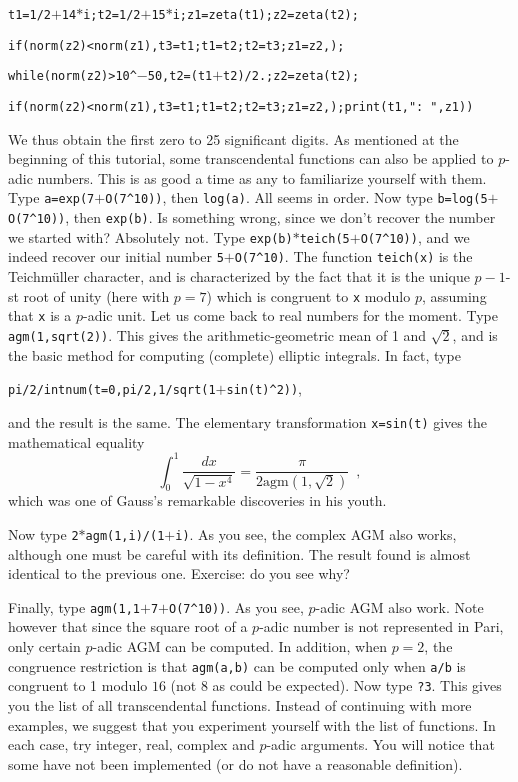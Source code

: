 \centerline{\tt t1=1/2$+$14$*$i;t2=1/2$+$15$*$i;z1=zeta(t1);z2=zeta(t2);}

\centerline{\tt if(norm(z2)<norm(z1),t3=t1;t1=t2;t2=t3;z1=z2,);}

\centerline{\tt while(norm(z2)>10\^{}$-$50,t2=(t1$+$t2)/2.;z2=zeta(t2);\bs}

\centerline{\tt if(norm(z2)<norm(z1),t3=t1;t1=t2;t2=t3;z1=z2,);print(t1,": ",z1))}

We thus obtain the first zero to 25 significant digits. 
\medskip
As mentioned at the beginning of this tutorial, some transcendental functions
can also be applied to $p$-adic numbers. This is as good a time as any to
familiarize yourself with them. Type {\tt a=exp(7$+$O(7\^{}10))}, then
{\tt log(a)}. All seems in order. Now type {\tt b=log(5$+$O(7\^{}10))}, then
{\tt exp(b)}. Is something wrong, since we don't recover the number we
started with? Absolutely not. Type {\tt exp(b)$*$teich(5$+$O(7\^{}10))}, and
we indeed recover our initial number {\tt 5$+$O(7\^{}10)}. The function
{\tt teich(x)} is the Teichm\"uller character, and is characterized by the
fact that it is the unique $p-1$-st root of unity (here with $p=7$) which
is congruent to {\tt x} modulo $p$, assuming that {\tt x} is a $p$-adic
unit. 
\smallskip
Let us come back to real numbers for the moment. Type {\tt agm(1,sqrt(2))}. 
This gives the arithmetic-geometric mean of 1 
and $\sqrt2$, and is the basic method for computing (complete) elliptic
integrals. In fact, type 

{\tt pi/2/intnum(t=0,pi/2,1/sqrt(1$+$sin(t)\^{}2))},

and the result is the same. The elementary transformation {\tt x=sin(t)}
gives the mathematical equality
$$\int_0^1\dfrac{dx}{\sqrt{1-x^4}}=\dfrac{\pi}{2\text{agm}(1,\sqrt2)}\enspace,$$
which was one of Gauss's remarkable discoveries in his youth.

Now type {\tt 2$*$agm(1,i)/(1$+$i)}. As you see, the complex AGM also works, 
although one must be careful with its definition. The result found is
almost identical to the previous one. Exercise: do you see why?

Finally, type {\tt agm(1,1$+$7$+$O(7\^{}10))}. As you see, $p$-adic AGM also
work. Note however that since the square root of a $p$-adic number is not
represented in Pari, only certain $p$-adic AGM can be computed. In addition,
when $p=2$, the congruence restriction is that {\tt agm(a,b)} can be computed
only when {\tt a/b} is congruent to 1 modulo $16$ (not 8 as could be expected).
\smallskip
Now type {\tt ?3}. This gives you the list of all transcendental functions.
Instead of continuing with more examples, we suggest that you experiment
yourself with the list of functions. In each case, try integer, real, complex
and $p$-adic arguments. You will notice that some have not been implemented
(or do not have a reasonable definition).
\medskip
